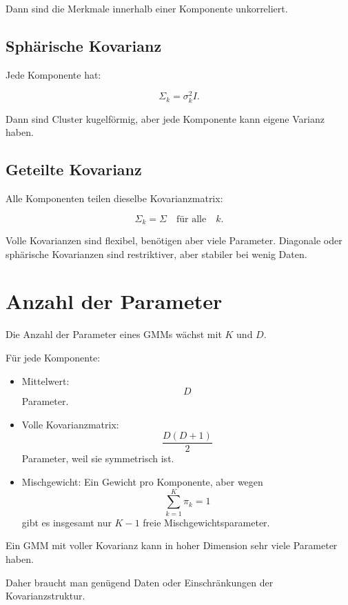 Dann sind die Merkmale innerhalb einer Komponente unkorreliert.

\subsection{Sphärische Kovarianz}

Jede Komponente hat:

\[
    \Sigma_k
    =
    \sigma_k^2 I.
\]

Dann sind Cluster kugelförmig, aber jede Komponente kann eigene Varianz haben.

\subsection{Geteilte Kovarianz}

Alle Komponenten teilen dieselbe Kovarianzmatrix:

\[
    \Sigma_k=\Sigma
    \quad
    \text{für alle}
    \quad
    k.
\]

\begin{notebox}
Volle Kovarianzen sind flexibel, benötigen aber viele Parameter.
Diagonale oder sphärische Kovarianzen sind restriktiver, aber stabiler bei wenig Daten.
\end{notebox}

\section{Anzahl der Parameter}

Die Anzahl der Parameter eines GMMs wächst mit \(K\) und \(D\).

Für jede Komponente:

\begin{itemize}
    \item Mittelwert:
    \[
        D
    \]
    Parameter.
    \item Volle Kovarianzmatrix:
    \[
        \frac{D(D+1)}{2}
    \]
    Parameter, weil sie symmetrisch ist.
    \item Mischgewicht:
    Ein Gewicht pro Komponente, aber wegen
    \[
        \sum_{k=1}^{K}\pi_k=1
    \]
    gibt es insgesamt nur \(K-1\) freie Mischgewichtsparameter.
\end{itemize}

\begin{conceptbox}
Ein GMM mit voller Kovarianz kann in hoher Dimension sehr viele Parameter haben.

Daher braucht man genügend Daten oder Einschränkungen der Kovarianzstruktur.
\end{conceptbox}

